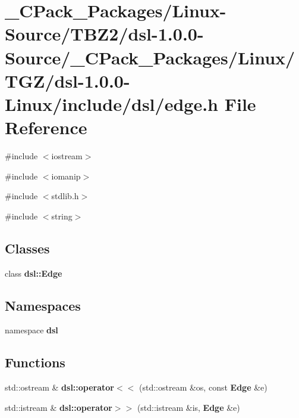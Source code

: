\section{\_\-CPack\_\-Packages/Linux-\/Source/TBZ2/dsl-\/1.0.0-\/Source/\_\-CPack\_\-Packages/Linux/TGZ/dsl-\/1.0.0-\/Linux/include/dsl/edge.h File Reference}
\label{__CPack__Packages_2Linux-Source_2TBZ2_2dsl-1_80_80-Source_2__CPack__Packages_2Linux_2TGZ_2dsl-1_7c1b4cbe792b028ee315a904f721be4d}
{\ttfamily \#include $<$iostream$>$}\par
{\ttfamily \#include $<$iomanip$>$}\par
{\ttfamily \#include $<$stdlib.h$>$}\par
{\ttfamily \#include $<$string$>$}\par
\subsection*{Classes}
\begin{DoxyCompactItemize}
\item 
class {\bf dsl::Edge}
\end{DoxyCompactItemize}
\subsection*{Namespaces}
\begin{DoxyCompactItemize}
\item 
namespace {\bf dsl}
\end{DoxyCompactItemize}
\subsection*{Functions}
\begin{DoxyCompactItemize}
\item 
std::ostream \& {\bf dsl::operator$<$$<$} (std::ostream \&os, const {\bf Edge} \&e)
\item 
std::istream \& {\bf dsl::operator$>$$>$} (std::istream \&is, {\bf Edge} \&e)
\end{DoxyCompactItemize}
